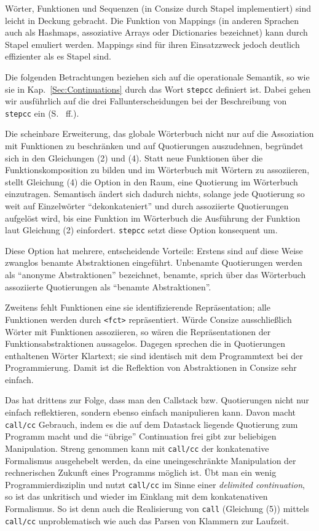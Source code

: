 Wörter, Funktionen und Sequenzen (in Consize durch Stapel implementiert) sind leicht in Deckung gebracht. Die Funktion von Mappings (in anderen Sprachen auch als Hashmaps, assoziative Arrays oder Dictionaries bezeichnet) kann durch Stapel emuliert werden. Mappings sind für ihren Einsatzzweck jedoch deutlich effizienter als es Stapel sind.

Die folgenden Betrachtungen beziehen sich auf die operationale Semantik, so wie sie in Kap.~\ref{Sec:Continuations} durch das Wort \verb|stepcc| definiert ist. Dabei gehen wir ausführlich auf die drei Fallunterscheidungen bei der Beschreibung von \verb|stepcc| ein (S.~\pageref{description.stepcc} ff.).

\smallskip{}
Die scheinbare Erweiterung, das globale Wörterbuch nicht nur auf die Assoziation mit Funktionen zu beschränken und auf Quotierungen auszudehnen, begründet sich in den Gleichungen (2) und (4). Statt neue Funktionen über die Funktionskomposition zu bilden und im Wörterbuch mit Wörtern zu assoziieren, stellt Gleichung (4) die Option in den Raum, eine Quotierung im Wörterbuch einzutragen. Semantisch ändert sich dadurch nichts, solange jede Quotierung so weit auf Einzelwörter "`dekonkateniert"' und durch assoziierte Quotierungen aufgelöst wird, bis eine Funktion im Wörterbuch die Ausführung der Funktion laut Gleichung (2) einfordert. \verb|stepcc| setzt diese Option konsequent um.

Diese Option hat mehrere, entscheidende Vorteile: Erstens sind auf diese Weise zwanglos benamte Abstraktionen eingeführt. Unbenamte Quotierungen werden als "`anonyme Abstraktionen"' bezeichnet, benamte, sprich über das Wörterbuch assoziierte Quotierungen als "`benamte Abstraktionen"'.

Zweitens fehlt Funktionen eine sie identifizierende Repräsentation; alle Funktionen werden durch \verb|<fct>| repräsentiert. Würde Consize ausschließlich Wörter mit Funktionen assoziieren, so wären die Repräsentationen der Funktionsabstraktionen aussagelos. Dagegen sprechen die in Quotierungen enthaltenen Wörter Klartext; sie sind identisch mit dem Programmtext bei der Programmierung. Damit ist die Reflektion von Abstraktionen in Consize sehr einfach.

Das hat drittens zur Folge, dass man den Callstack bzw. Quotierungen nicht nur einfach reflektieren, sondern ebenso einfach manipulieren kann. Davon macht \verb|call/cc| Gebrauch, indem es die auf dem Datastack liegende Quotierung zum Programm macht und die "`übrige"' Continuation frei gibt zur beliebigen Manipulation. Streng genommen kann mit \verb|call/cc| der konkatenative Formalismus ausgehebelt werden, da eine uneingeschränkte Manipulation der rechnerischen Zukunft eines Programms möglich ist. Übt man ein wenig Programmierdisziplin und nutzt \verb|call/cc| im Sinne einer \emph{delimited continuation}, so ist das unkritisch und wieder im Einklang mit dem konkatenativen Formalismus. So ist denn auch die Realisierung von \verb|call| (Gleichung (5)) mittels \verb|call/cc| unproblematisch wie auch das Parsen von Klammern zur Laufzeit.

